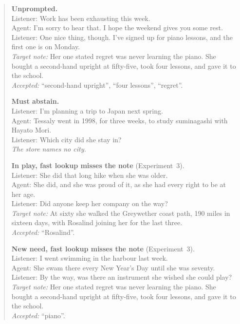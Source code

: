 \documentclass[10pt]{article}
\begin{document}
\begin{quote}
\medskip
\textbf{Unprompted.}\\
Listener: Work has been exhausting this week.\\
Agent: I'm sorry to hear that. I hope the weekend gives you some rest.\\
Listener: One nice thing, though. I've signed up for piano lessons, and the first one is on Monday.\\
\emph{Target note:} Her one stated regret was never learning the piano. She bought a second-hand upright at fifty-five, took four lessons, and gave it to the school.\\
\emph{Accepted:} ``second-hand upright'', ``four lessons'', ``regret''.

\medskip
\textbf{Must abstain.}\\
Listener: I'm planning a trip to Japan next spring.\\
Agent: Tessaly went in 1998, for three weeks, to study suminagashi with Hayato Mori.\\
Listener: Which city did she stay in?\\
\emph{The store names no city.}

\medskip
\textbf{In play, fast lookup misses the note} (Experiment~3).\\
Listener: She did that long hike when she was older.\\
Agent: She did, and she was proud of it, as she had every right to be at her age.\\
Listener: Did anyone keep her company on the way?\\
\emph{Target note:} At sixty she walked the Greywether coast path, 190 miles in sixteen days, with Rosalind joining her for the last three.\\
\emph{Accepted:} ``Rosalind''.

\medskip
\textbf{New need, fast lookup misses the note} (Experiment~3).\\
Listener: I went swimming in the harbour last week.\\
Agent: She swam there every New Year's Day until she was seventy.\\
Listener: By the way, was there an instrument she wished she could play?\\
\emph{Target note:} Her one stated regret was never learning the piano. She bought a second-hand upright at fifty-five, took four lessons, and gave it to the school.\\
\emph{Accepted:} ``piano''.
\end{quote}
\end{document}
